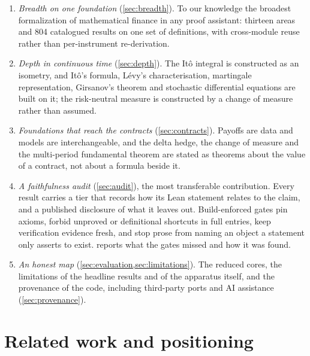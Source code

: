 \documentclass[11pt]{article}
\begin{document}
\begin{enumerate}[label=(\arabic*)]
\item \emph{Breadth on one foundation} (\cref{sec:breadth}). To our knowledge the broadest formalization of
  mathematical finance in any proof assistant: thirteen areas and 804 catalogued results on one set of
  definitions, with cross-module reuse rather than per-instrument re-derivation.
\item \emph{Depth in continuous time} (\cref{sec:depth}). The It\^o integral is constructed as an isometry, and
  It\^o's formula, L\'evy's characterisation, martingale representation, Girsanov's theorem and stochastic
  differential equations are built on it; the risk-neutral measure is constructed by a change of measure rather than
  assumed.
\item \emph{Foundations that reach the contracts} (\cref{sec:contracts}). Payoffs are data and models are
  interchangeable, and the delta hedge, the change of measure and the multi-period fundamental theorem are stated
  as theorems about the value of a contract, not about a formula beside it.
\item \emph{A faithfulness audit} (\cref{sec:audit}), the most transferable contribution. Every result carries a
  tier that records how its Lean statement relates to the claim, and a published disclosure of what it leaves
  out. Build-enforced gates pin axioms, forbid unproved or definitional shortcuts in full entries, keep
  verification evidence fresh, and stop prose from naming an object a statement only asserts to exist.
   reports what the gates missed and how it was found.
\item \emph{An honest map} (\cref{sec:evaluation,sec:limitations}). The reduced cores, the limitations of the
  headline results and of the apparatus itself, and the provenance of the code,
  including third-party ports and AI assistance (\cref{sec:provenance}).
\end{enumerate}

\section{Related work and positioning}\label{sec:related}
\end{document}
